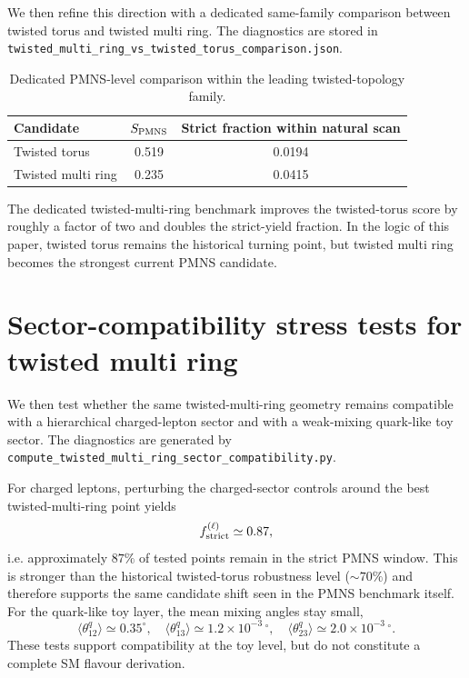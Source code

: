 \documentclass[aps,prd,onecolumn,nofootinbib,superscriptaddress]{revtex4-2}
\begin{document}
We then refine this direction with a dedicated same-family comparison between twisted torus and twisted multi ring.
The diagnostics are stored in \texttt{twisted\_multi\_ring\_vs\_twisted\_torus\_comparison.json}.

\begin{table}[t]
  \centering
  \begin{tabular}{lcc}
    \hline\hline
    Candidate & $S_{\rm PMNS}$ & Strict fraction within natural scan \\
    \hline
    Twisted torus & 0.519 & 0.0194 \\
    Twisted multi ring & 0.235 & 0.0415 \\
    \hline\hline
  \end{tabular}
  \caption{Dedicated PMNS-level comparison within the leading twisted-topology family.}
  \label{tab:paper5-twisted-headtohead}
\end{table}

The dedicated twisted-multi-ring benchmark improves the twisted-torus score by roughly a factor of two and doubles the strict-yield fraction.
In the logic of this paper, twisted torus remains the historical turning point, but twisted multi ring becomes the strongest current PMNS candidate.

\section{Sector-compatibility stress tests for twisted multi ring}
We then test whether the same twisted-multi-ring geometry remains compatible with a hierarchical charged-lepton sector and with a weak-mixing quark-like toy sector.
The diagnostics are generated by \texttt{compute\_twisted\_multi\_ring\_sector\_compatibility.py}.

For charged leptons, perturbing the charged-sector controls around the best twisted-multi-ring point yields
\begin{equation}
f_{\rm strict}^{(\ell)}\simeq 0.87,
\end{equation}
i.e. approximately $87\%$ of tested points remain in the strict PMNS window.
This is stronger than the historical twisted-torus robustness level ($\sim 70\%$) and therefore supports the same candidate shift seen in the PMNS benchmark itself.
For the quark-like toy layer, the mean mixing angles stay small,
\begin{equation}
\langle \theta_{12}^{q}\rangle\simeq 0.35^\circ,\quad
\langle \theta_{13}^{q}\rangle\simeq 1.2\times10^{-3}\,^\circ,\quad
\langle \theta_{23}^{q}\rangle\simeq 2.0\times10^{-3}\,^\circ.
\end{equation}
These tests support compatibility at the toy level, but do not constitute a complete SM flavour derivation.
\end{document}
